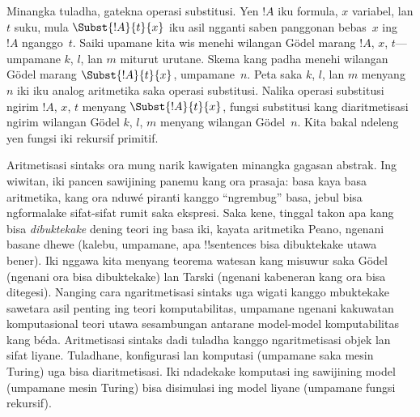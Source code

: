 \documentclass[../../../include/open-logic-section]{subfiles}
\begin{document}
Minangka tuladha, gatekna operasi substitusi.
Yen $!A$ iku formula, $x$ variabel, lan
$t$ suku, mula $\Subst{!A}{t}{x}$ iku
asil ngganti saben panggonan bebas~$x$
ing~$!A$ nganggo~$t$. Saiki upamane kita
wis menehi wilangan G\"odel marang $!A$,
$x$, $t$---umpamane $k$, $l$, lan $m$
miturut urutane. Skema kang padha menehi
wilangan G\"odel marang
$\Subst{!A}{t}{x}$, umpamane~$n$.
Peta saka $k$, $l$, lan $m$ menyang
$n$ iki iku analog aritmetika saka operasi
substitusi. Nalika operasi substitusi
ngirim $!A$, $x$, $t$ menyang
$\Subst{!A}{t}{x}$, fungsi substitusi
kang diaritmetisasi ngirim wilangan G\"odel
$k$, $l$, $m$ menyang wilangan G\"odel~$n$.
Kita bakal ndeleng yen fungsi iki rekursif
primitif.

Aritmetisasi sintaks ora mung narik kawigaten
minangka gagasan abstrak. Ing wiwitan, iki
pancen sawijining panemu kang ora prasaja:
basa kaya basa aritmetika, kang ora nduwé
piranti kanggo ``ngrembug'' basa, jebul
bisa ngformalake sifat-sifat rumit saka
ekspresi. Saka kene, tinggal takon apa
kang bisa \emph{dibuktekake} dening teori
ing basa iki, kayata aritmetika Peano,
ngenani basane dhewe (kalebu, umpamane,
apa !!{sentence}s bisa dibuktekake utawa
bener). Iki nggawa kita menyang teorema
watesan kang misuwur saka G\"odel
(ngenani ora bisa dibuktekake) lan Tarski
(ngenani kabeneran kang ora bisa ditegesi).
Nanging cara ngaritmetisasi sintaks uga
wigati kanggo mbuktekake sawetara asil
penting ing teori komputabilitas, umpamane
ngenani kakuwatan komputasional teori
utawa sesambungan antarane model-model
komputabilitas kang béda. Aritmetisasi
sintaks dadi tuladha kanggo ngaritmetisasi
objek lan sifat liyane. Tuladhane,
konfigurasi lan komputasi (umpamane
saka mesin Turing) uga bisa diaritmetisasi.
Iki ndadekake komputasi ing sawijining
model (umpamane mesin Turing) bisa
disimulasi ing model liyane (umpamane
fungsi rekursif).
\end{document}

